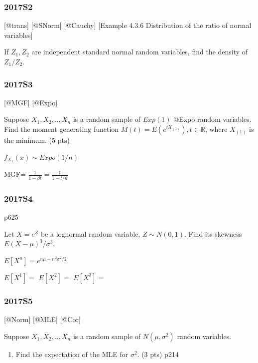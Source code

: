 \documentclass[6pt,twocolumn,Portrait]{article}
\providecommand{\tightlist}{%
  \setlength{\itemsep}{0pt}\setlength{\parskip}{0pt}}
\begin{document}
\hypertarget{s2-5}{%
\subsubsection{2017S2}\label{s2-5}}

{[}@trans{]} {[}@SNorm{]} {[}@Cauchy{]} {[}Example 4.3.6 Distribution of
the ratio of normal variables{]}

If \(Z_1,Z_2\) are independent standard normal random variables, find
the density of \(Z_1/Z_2\).

\hypertarget{s3-5}{%
\subsubsection{2017S3}\label{s3-5}}

{[}@MGF{]} {[}@Expo{]}

Suppose \(X_1,X_2,..,X_n\) is a random sample of \(Exp(1)\) @Expo random
variables. Find the moment generating function
\(M(t)=E(e^{tX_{(1)}}), t\in\mathbb R\), where \(X_{(1)}\) is the
minimum. (5 pts)

\(f_{X_{1}}(x)\sim Expo(1/n)\)

MGF= \(\frac1{1-\beta t}=\frac1{1-t/n}\)

\hypertarget{s4-5}{%
\subsubsection{2017S4}\label{s4-5}}

p625

Let \(X=e^Z\) be a lognormal random variable, \(Z\sim N(0,1)\). Find its
skewness \(E(X-\mu)^3/\sigma^3\).

\(E[X^n]=e^{n\mu+n^2\sigma^2/2}\)

\(E[X^1]=\) \(E[X^2]=\) \(E[X^3]=\)

\hypertarget{s5-5}{%
\subsubsection{2017S5}\label{s5-5}}

{[}@Norm{]} {[}@MLE{]} {[}@Cor{]}

Suppose \(X_1,X_2,..,X_n\) is a random sample of \(N(\mu,\sigma^2)\)
random variables.

\begin{enumerate}
\def\labelenumi{(\alph{enumi})}
\tightlist
\item
  Find the expectation of the MLE for \(\sigma^2\). (3 pts) p214
\end{enumerate}
\end{document}
